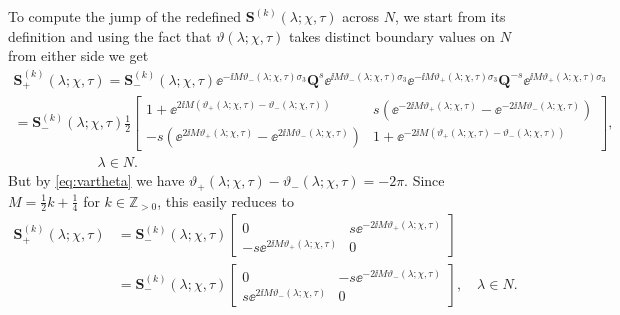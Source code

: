 To compute the jump of the redefined $\mathbf{S}^{(k)}(\lambda;\chi,\tau)$ across $N$,
we start from its definition and using the fact that $\vartheta(\lambda;\chi,\tau)$ takes distinct boundary values on $N$ from either side we get
\begin{multline}
\mathbf{S}^{(k)}_+(\lambda;\chi,\tau)=\mathbf{S}_-^{(k)}(\lambda;\chi,\tau)\ee^{-\ii M\vartheta_-(\lambda;\chi,\tau)\sigma_3}\mathbf{Q}^s\ee^{\ii M\vartheta_-(\lambda;\chi,\tau)\sigma_3}
\ee^{-\ii M\vartheta_+(\lambda;\chi,\tau)\sigma_3}\mathbf{Q}^{-s}\ee^{\ii M\vartheta_+(\lambda;\chi,\tau)\sigma_3}\\
{}=\mathbf{S}_-^{(k)}(\lambda;\chi,\tau)\frac{1}{2}
\begin{bmatrix} 1+\ee^{2\ii M(\vartheta_+(\lambda;\chi,\tau)-\vartheta_-(\lambda;\chi,\tau))} & 
s\left(\ee^{-2\ii M\vartheta_+(\lambda;\chi,\tau)}-\ee^{-2\ii M\vartheta_-(\lambda;\chi,\tau)}\right)\\
-s\left(\ee^{2\ii M\vartheta_+(\lambda;\chi,\tau)}-\ee^{2\ii M\vartheta_-(\lambda;\chi,\tau)}\right) & 
1+\ee^{-2\ii M(\vartheta_+(\lambda;\chi,\tau)-\vartheta_-(\lambda;\chi,\tau))}\end{bmatrix},\\
\quad\quad\quad\quad\quad\quad\lambda\in N.
\end{multline}
But by \eqref{eq:vartheta} we have $\vartheta_+(\lambda;\chi,\tau)-\vartheta_-(\lambda;\chi,\tau)=-2\pi$.  Since $M=\tfrac{1}{2}k+\tfrac{1}{4}$ for $k\in\mathbb{Z}_{>0}$, this easily reduces to
\begin{equation}
\begin{split}
\mathbf{S}^{(k)}_+(\lambda;\chi,\tau)&=\mathbf{S}_-^{(k)}(\lambda;\chi,\tau)\begin{bmatrix}0 & s\ee^{-2\ii M\vartheta_+(\lambda;\chi,\tau)}\\-s\ee^{2\ii M\vartheta_+(\lambda;\chi,\tau)} & 0\end{bmatrix}\\
&=\mathbf{S}_-^{(k)}(\lambda;\chi,\tau)\begin{bmatrix}0 & -s\ee^{-2\ii M\vartheta_-(\lambda;\chi,\tau)}\\
s\ee^{2\ii M\vartheta_-(\lambda;\chi,\tau)} & 0\end{bmatrix},\quad\lambda\in N.
\end{split}
\label{eq:S-N-jump-ALT}
\end{equation}

